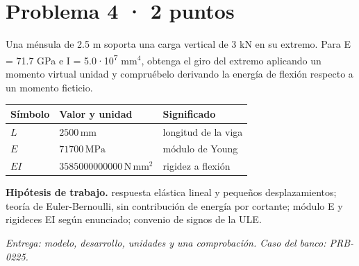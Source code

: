 \par\medskip\noindent\begin{minipage}{\linewidth}

\section{Problema 4 · 2 puntos}

Una ménsula de 2.5 m soporta una carga vertical de 3 kN en su extremo. Para E = 71.7 GPa e I = 5.0·10\textsuperscript{7} mm$^4$, obtenga el giro del extremo aplicando un momento virtual unidad y compruébelo derivando la energía de flexión respecto a un momento ficticio.

\par\medskip\noindent\begin{tabular}{@{}p{.18\linewidth}p{.26\linewidth}p{.48\linewidth}@{}}
\toprule Símbolo & Valor y unidad & Significado\\\midrule
$L$ & $2500\,\mathrm{mm}$ & longitud de la viga\\
$E$ & $71700\,\mathrm{MPa}$ & módulo de Young\\
$EI$ & $3585000000000\,\mathrm{N\,mm^2}$ & rigidez a flexión\\
\bottomrule\end{tabular}\par\medskip



\par\textbf{Hipótesis de trabajo.} respuesta elástica lineal y pequeños desplazamientos; teoría de Euler-Bernoulli, sin contribución de energía por cortante; módulo E y rigideces EI según enunciado; convenio de signos de la ULE.

\par\textit{Entrega: modelo, desarrollo, unidades y una comprobación. Caso del banco: PRB-0225.}\end{minipage}\par\medskip


